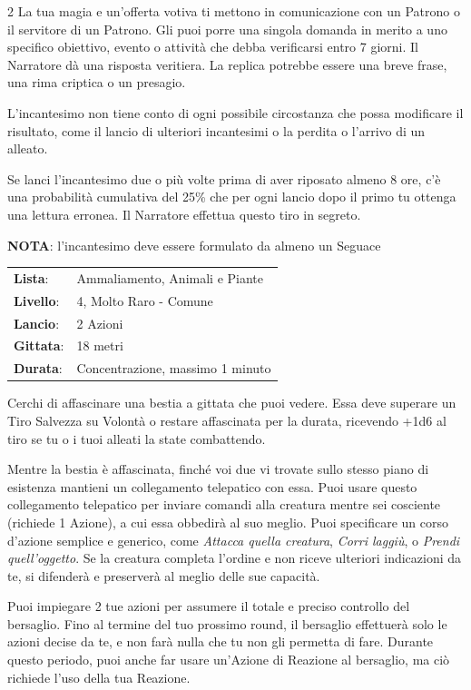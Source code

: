 \begin{multicols}{2}
La tua magia e un'offerta votiva ti mettono in comunicazione con un Patrono o il servitore di un Patrono. Gli puoi porre una singola domanda in merito a uno specifico obiettivo, evento o attività che debba verificarsi entro 7 giorni. Il Narratore dà una risposta veritiera. La replica potrebbe essere una breve frase, una rima criptica o un presagio.

L'incantesimo non tiene conto di ogni possibile circostanza che possa modificare il risultato, come il lancio di ulteriori incantesimi o la perdita o l'arrivo di un alleato.

Se lanci l'incantesimo due o più volte prima di aver riposato almeno 8 ore, c'è una probabilità cumulativa del 25\% che per ogni lancio dopo il primo tu ottenga una lettura erronea. Il Narratore effettua questo tiro in segreto.

\textbf{NOTA}: l'incantesimo deve essere formulato da almeno un Seguace

\noindent\begin{tabularx}{\linewidth}{p{1.9cm}X}
	\rowcolor{gray!20}\textbf{Lista}: & Ammaliamento, Animali e Piante \\
	\textbf{Livello}: & 4, Molto Raro - Comune \\
	\rowcolor{gray!20}\textbf{Lancio}: & 2 Azioni \\
	\textbf{Gittata}: & 18 metri \\
	\rowcolor{gray!20}\textbf{Durata}: & Concentrazione, massimo 1 minuto \\
\end{tabularx}\smallskip

Cerchi di affascinare una bestia a gittata che puoi vedere. Essa deve superare un Tiro Salvezza su Volontà o restare affascinata per la durata, ricevendo +1d6 al tiro se tu o i tuoi alleati la state combattendo.

Mentre la bestia è affascinata, finché voi due vi trovate sullo stesso piano di esistenza mantieni un collegamento telepatico con essa. Puoi usare questo collegamento telepatico per inviare comandi alla creatura mentre sei cosciente (richiede 1 Azione), a cui essa obbedirà al suo meglio. Puoi specificare un corso d'azione semplice e generico, come \emph{Attacca quella creatura}, \emph{Corri laggiù}, o \emph{Prendi quell'oggetto}. Se la creatura completa l'ordine e non riceve ulteriori indicazioni da te, si difenderà e preserverà al meglio delle sue capacità.

Puoi impiegare 2 tue azioni per assumere il totale e preciso controllo del bersaglio. Fino al termine del tuo prossimo round, il bersaglio effettuerà solo le azioni decise da te, e non farà nulla che tu non gli permetta di fare. Durante questo periodo, puoi anche far usare un'Azione di Reazione al bersaglio, ma ciò richiede l'uso della tua Reazione.


\end{multicols}
